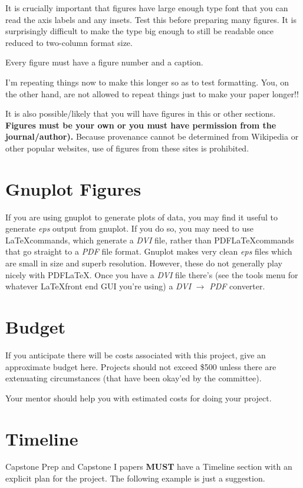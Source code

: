 \documentclass[aps,prb,twocolumn,groupedaddress,nofootinbib,floatfix]{revtex4}
\begin{document}
It is crucially important that figures have large enough type font that you can read the axis labels and any insets.   Test this before preparing many figures.   It is surprisingly difficult to make the type big enough to still be readable once reduced to two-column format size.

Every figure must have a figure number and a caption.

I'm repeating things now to make this longer so as to test formatting.  You, on the other hand, are not allowed to repeat things just to make your paper longer!!

It is also possible/likely that you will have figures in this or other
sections.  \textbf{Figures must be your own or you
must have permission from the journal/author).}  Because provenance
cannot be determined from Wikipedia or other popular websites, use of
figures from these sites is prohibited.   

\section*{Gnuplot Figures}
If you are using gnuplot to generate plots of data, you may find it useful to generate \textit{eps} output from gnuplot.   If you do so, you may need to use \LaTeX commands, which generate a \textit{DVI} file, rather than PDF\LaTeX commands that go straight to a \textit{PDF} file format.   Gnuplot makes very clean \textit{eps} files which are small in size and superb resolution.   However, these do not generally play nicely with PDF\LaTeX.    Once you have a \textit{DVI} file there's (see the tools menu for whatever \LaTeX front end GUI you're using) a \textit{DVI} $\rightarrow$ \textit{PDF} converter.
\section*{Budget}
If you anticipate there will be costs associated with this project, give an approximate budget here.  Projects should not exceed \$500 unless there are extenuating circumstances (that have been okay'ed by the committee).

Your mentor should help you with estimated costs for doing your project.

\section*{Timeline}

Capstone Prep and Capstone I papers {\bf MUST} have a Timeline section with an explicit
plan for the project.  The following example is just a suggestion.
\end{document}
